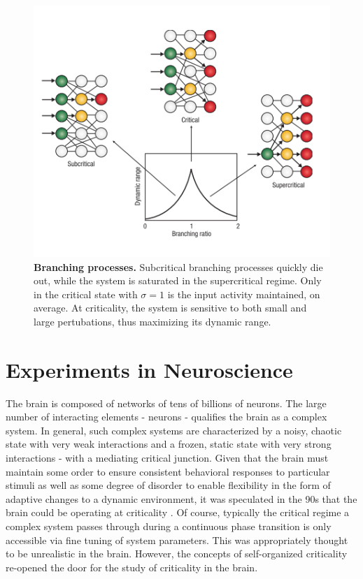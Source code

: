 \documentclass[12pt]{article}
\begin{document}
\begin{figure}      
  \begin{center}    
 \includegraphics[width=.7\textwidth]{Branchingprocesschialvo}    
    \caption{\textbf{Branching processes.} Subcritical branching processes quickly die out, while the system is saturated in the supercritical regime. Only in the critical state with $\sigma = 1$ is the input activity maintained, on average. At criticality, the system is sensitive to both small and large pertubations, thus maximizing its dynamic range. \cite{Chialvo2006a}}   
   \label{Figure::Critical Branching Process}   
  \end{center}     
   \end{figure}

\section*{Experiments in Neuroscience}

The brain is composed of networks of tens of billions of neurons. The large number of interacting elements - neurons - qualifies the brain as a complex system. In general, such complex systems are characterized by a noisy, chaotic state with very weak interactions and a frozen, static state with very strong interactions - with a mediating critical junction. Given that the brain must maintain some order to ensure consistent behavioral responses to particular stimuli as well as some degree of disorder to enable flexibility in the form of adaptive changes to a dynamic environment, it was speculated in the 90s that the brain could be operating at criticality \cite{Bak1987a}. Of course, typically the critical regime a complex system passes through during a continuous phase transition is only accessible via fine tuning of system parameters. This was appropriately  thought to be unrealistic in the brain. However, the concepts of self-organized criticality re-opened the door for the study of criticality in the brain.
\end{document}
